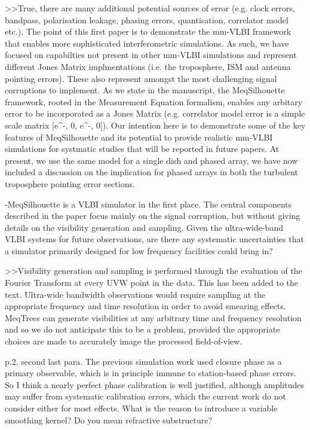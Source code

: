 >>True, there are many additional potential sources of error (e.g. clock errors, bandpass, polarisation leakage, phasing errors, quantisation, correlator model etc.). The point of this first paper is to demonstrate the mm-VLBI framework that enables more sophisticated interferometric simulations. As such, we have focused on capabilties not present in other mm-VLBI simulations and represent different Jones Matrix implmentations (i.e. the troposphere, ISM and antenna pointing errors). These also represent amongst the most challenging signal corruptions to implement. As we state in the manuscript, the MeqSilhouette framework, rooted in the Measurement Equation formalism, enables any arbitary error to be incorporated as a Jones Matrix (e.g. correlator model error is a simple scale matrix [e^-\phi, 0, e^-\phi, 0]). Our intention here is to demonstrate some of the key features of MeqSilhouette and its potential to provide realistic mm-VLBI simulations for systmatic studies that will be reported in future papers. At present, we use the same model for a single dish and phased array, we have now included a discussion on the implication for phased arrays in both the turbulent troposphere pointing error sections.


-MeqSilhouette is a VLBI simulator in the first place. The central components described in the paper focus mainly on the signal corruption, but without giving details on the visibility generation and sampling. Given the ultra-wide-band VLBI systems for future observations, are there any systematic uncertainties that a simulator primarily designed for low frequency facilities could bring in?

>>Visibility generation and sampling is performed through the evaluation of the Fourier Transform at every UVW point in the data. This has been added to the text. Ultra-wide bandwidth observations would require sampling at the appropriate frequency and time resolution in order to avoid smearing effects. MeqTrees can generate visibilities at any arbitrary time and frequency resolution and so we do not anticipate this to be a problem, provided the appropriate choices are made to accurately image the processed field-of-view.



p.2, second last para. The previous simulation work used closure phase as a primary observable, which is in principle immune to station-based phase errors. So I think a nearly perfect phase calibration is well justified, although amplitudes may suffer from systematic calibration errors, which the current work do not consider either for most effects. What is the reason to introduce a variable smoothing kernel? Do you mean refractive substructure?

